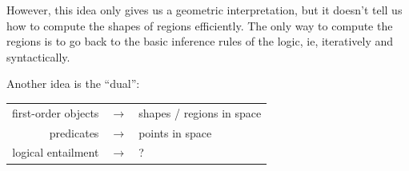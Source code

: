 However, this idea only gives us a geometric interpretation, but it doesn't tell us how to compute the shapes of regions efficiently.  The only way to compute the regions is to go back to the basic inference rules of the logic, ie, iteratively and syntactically.

Another idea is the ``dual'':

\tab \begin{tabular}{rll}
first-order objects & $\longrightarrow$ & shapes / regions in space\\
predicates          & $\longrightarrow$ & points in space\\
logical entailment  & $\longrightarrow$ & ?\\
\end{tabular}
